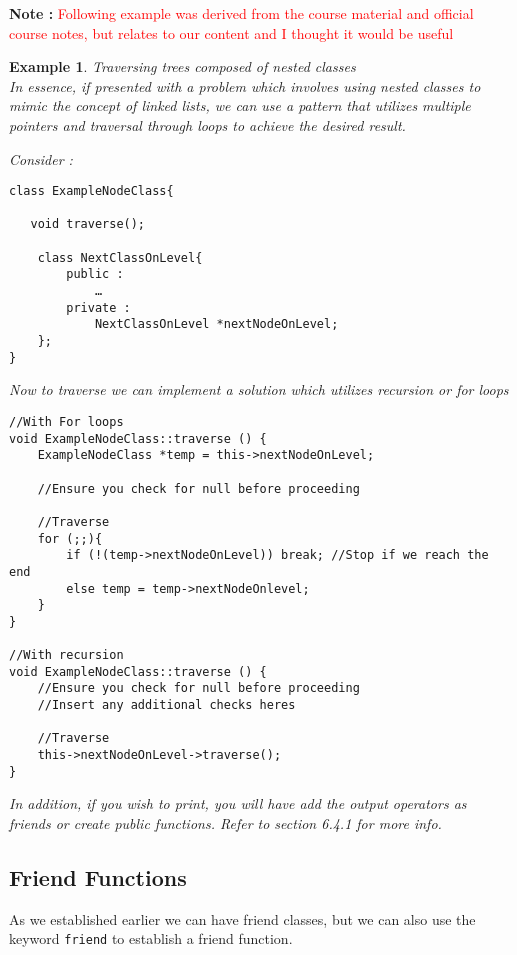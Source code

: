 \documentclass{article}
\newtheorem{ex}[theorem]{Example}
\begin{document}
 \textbf{Note : }\textcolor{red}{Following example was derived from the course material and official course notes, but relates to our content and I thought it would be useful}
\begin{ex} Traversing trees composed of nested classes \\



In essence, if presented with a problem which involves using nested classes to mimic the concept of linked lists, we can use a pattern that utilizes multiple pointers and traversal through loops to achieve the desired result.

Consider : 
\begin{lstlisting}
class ExampleNodeClass{

   void traverse();

	class NextClassOnLevel{
		public :
			…
		private :
			NextClassOnLevel *nextNodeOnLevel; 
	};
}
\end{lstlisting}

Now to traverse we can implement a solution which utilizes recursion or for loops

\begin{lstlisting}
//With For loops 
void ExampleNodeClass::traverse () {
    ExampleNodeClass *temp = this->nextNodeOnLevel;

    //Ensure you check for null before proceeding 

    //Traverse 
    for (;;){
        if (!(temp->nextNodeOnLevel)) break; //Stop if we reach the end
        else temp = temp->nextNodeOnlevel; 
    }
}

//With recursion 
void ExampleNodeClass::traverse () {
    //Ensure you check for null before proceeding 
    //Insert any additional checks heres 

    //Traverse 
    this->nextNodeOnLevel->traverse(); 
}
\end{lstlisting}

In addition, if you wish to print, you will have add the output operators as friends or create public functions. Refer to section 6.4.1 for more info. 

\end{ex}

\subsection{Friend Functions}
As we established earlier we can have friend classes, but we can also use the keyword \verb|friend| to establish a friend function.
\end{document}
